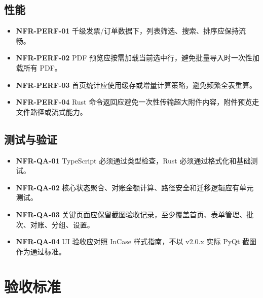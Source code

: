 \documentclass[UTF8,zihao=-4]{ctexart}
\newcommand{\req}[1]{\textbf{\textcolor{ivicBrown}{#1}}}
\begin{document}
\subsection{性能}

\begin{itemize}
  \item \req{NFR-PERF-01} 千级发票/订单数据下，列表筛选、搜索、排序应保持流畅。
  \item \req{NFR-PERF-02} PDF 预览应按需加载当前选中行，避免批量导入时一次性加载所有 PDF。
  \item \req{NFR-PERF-03} 首页统计应使用缓存或增量计算策略，避免频繁全表重算。
  \item \req{NFR-PERF-04} Rust 命令返回应避免一次性传输超大附件内容，附件预览走文件路径或流式能力。
\end{itemize}

\subsection{测试与验证}

\begin{itemize}
  \item \req{NFR-QA-01} TypeScript 必须通过类型检查，Rust 必须通过格式化和基础测试。
  \item \req{NFR-QA-02} 核心状态聚合、对账金额计算、路径安全和迁移逻辑应有单元测试。
  \item \req{NFR-QA-03} 关键页面应保留截图验收记录，至少覆盖首页、表单管理、批次、对账、分组、设置。
  \item \req{NFR-QA-04} UI 验收应对照 InCase 样式指南，不以 v2.0.x 实际 PyQt 截图作为通过标准。
\end{itemize}

\section{验收标准}
\end{document}

